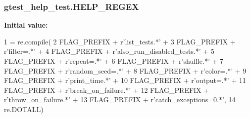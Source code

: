 \subsubsection[{\texorpdfstring{H\+E\+L\+P\+\_\+\+R\+E\+G\+EX}{HELP_REGEX}}]{\setlength{\rightskip}{0pt plus 5cm}gtest\+\_\+help\+\_\+test.\+H\+E\+L\+P\+\_\+\+R\+E\+G\+EX}\hypertarget{namespacegtest__help__test_acaee97106f5b6ad6de66778688d4b906}{}\label{namespacegtest__help__test_acaee97106f5b6ad6de66778688d4b906}
{\bfseries Initial value\+:}
\begin{DoxyCode}
1 = re.compile(
2     FLAG\_PREFIX + \textcolor{stringliteral}{r'list\_tests.*'} +
3     FLAG\_PREFIX + \textcolor{stringliteral}{r'filter=.*'} +
4     FLAG\_PREFIX + \textcolor{stringliteral}{r'also\_run\_disabled\_tests.*'} +
5     FLAG\_PREFIX + \textcolor{stringliteral}{r'repeat=.*'} +
6     FLAG\_PREFIX + \textcolor{stringliteral}{r'shuffle.*'} +
7     FLAG\_PREFIX + \textcolor{stringliteral}{r'random\_seed=.*'} +
8     FLAG\_PREFIX + \textcolor{stringliteral}{r'color=.*'} +
9     FLAG\_PREFIX + \textcolor{stringliteral}{r'print\_time.*'} +
10     FLAG\_PREFIX + \textcolor{stringliteral}{r'output=.*'} +
11     FLAG\_PREFIX + \textcolor{stringliteral}{r'break\_on\_failure.*'} +
12     FLAG\_PREFIX + \textcolor{stringliteral}{r'throw\_on\_failure.*'} +
13     FLAG\_PREFIX + \textcolor{stringliteral}{r'catch\_exceptions=0.*'},
14     re.DOTALL)
\end{DoxyCode}

